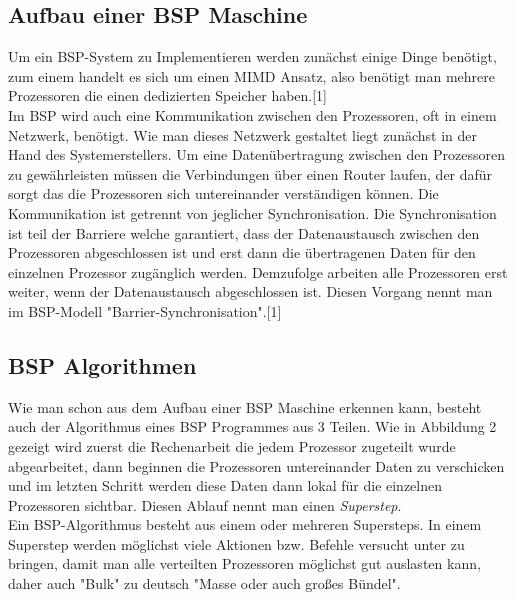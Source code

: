 \documentclass[a4paper,10pt]{scrartcl}
\begin{document}
\subsection{Aufbau einer BSP Maschine}
Um ein BSP-System zu Implementieren werden zunächst einige Dinge benötigt, zum einem handelt es sich um einen MIMD Ansatz, also benötigt man mehrere Prozessoren die einen dedizierten Speicher haben.[1]\\
Im BSP wird auch eine Kommunikation zwischen den Prozessoren, oft in einem Netzwerk, benötigt. Wie man dieses Netzwerk gestaltet liegt zunächst in der Hand des Systemerstellers. Um eine Datenübertragung zwischen den Prozessoren zu gewährleisten müssen die Verbindungen über einen Router laufen, der dafür sorgt das die Prozessoren sich untereinander verständigen können. Die Kommunikation ist getrennt von jeglicher Synchronisation. Die Synchronisation ist teil der Barriere welche garantiert, dass der Datenaustausch zwischen den Prozessoren abgeschlossen ist und erst dann die übertragenen Daten für den einzelnen Prozessor zugänglich werden. Demzufolge arbeiten alle Prozessoren erst weiter, wenn der Datenaustausch abgeschlossen ist. Diesen Vorgang nennt man im BSP-Modell "Barrier-Synchronisation".[1]

\subsection{BSP Algorithmen}
Wie man schon aus dem Aufbau einer BSP Maschine erkennen kann, besteht auch der Algorithmus eines BSP Programmes aus 3 Teilen. Wie in Abbildung 2 gezeigt wird zuerst die Rechenarbeit die jedem Prozessor zugeteilt wurde abgearbeitet, dann beginnen die Prozessoren untereinander Daten zu verschicken und im letzten Schritt werden diese Daten dann lokal für die einzelnen Prozessoren sichtbar. Diesen Ablauf nennt man einen \textit{Superstep}.\\
Ein BSP-Algorithmus besteht aus einem oder mehreren Supersteps. In einem Superstep werden möglichst viele Aktionen bzw. Befehle versucht unter zu bringen, damit man alle verteilten Prozessoren möglichst gut auslasten kann, daher auch "Bulk" zu deutsch "Masse oder auch großes Bündel".  	
\end{document}

